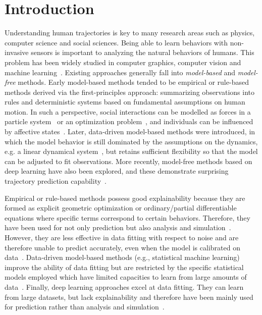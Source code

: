 \documentclass[runningheads]{llncs}
\begin{document}
\section{Introduction}
Understanding human trajectories is key to many research areas such as physics, computer science and social sciences. Being able to learn behaviors with non-invasive sensors is important to analyzing the natural behaviors of humans. This problem has been widely studied in computer graphics, computer vision and machine learning~\cite{BENDALIBRAHAM_recent_2021}. Existing approaches generally fall into \textit{model-based} and \textit{model-free} methods. Early model-based methods tended to be empirical or rule-based methods derived via the first-principles approach: summarizing observations into rules and deterministic systems based on fundamental assumptions on human motion. In such a perspective, social interactions can be modelled as forces in a particle system~\cite{helbing1995social} or an optimization problem~\cite{vanDenBerg_reciprocal_2008}, and individuals can be influenced by affective states~\cite{Luo_Agentbased_2008}. Later, data-driven model-based methods were introduced, in which the model behavior is still dominated by the assumptions on the dynamics, e.g. a linear dynamical system~\cite{He_Informative_2020}, but retains sufficient flexibility so that the model can be adjusted to fit observations. 
More recently, model-free methods based on deep learning have also been explored, and these demonstrate surprising trajectory prediction capability~\cite{alahi2016social,gupta2018social,sadeghian2019sophie,bhattacharyya2019conditional,li2019conditional,liang2019peeking,deo2020trajectory,liang2020simaug,mangalam2020not,salzmann2020trajectron++,liang2020garden,mangalam2021goals,su2021pedestrian,zhou2021sliding,gao2022social,xia2022cscnet}.

Empirical or rule-based methods possess good explainability because they are formed as explicit geometric optimization or ordinary/partial differentiable equations where specific terms correspond to certain behaviors.
Therefore, they have been used for not only prediction but also analysis and simulation~\cite{vantoll_algorithms_2021}. However, they are less effective in data fitting with respect to noise and are therefore unable to predict accurately, even when the model is calibrated on data~\cite{Wolinski_paramter_2014}. Data-driven model-based methods (e.g., statistical machine learning) improve the ability of data fitting but are restricted by the specific statistical models employed which have limited capacities to learn from large amounts of data~\cite{He_Informative_2020}. Finally, deep learning approaches excel at data fitting. They can learn from large datasets, but lack explainability and therefore have been mainly used for prediction rather than analysis and simulation~\cite{alahi2016social,mangalam2020not,zhou2021sliding}.
\end{document}
